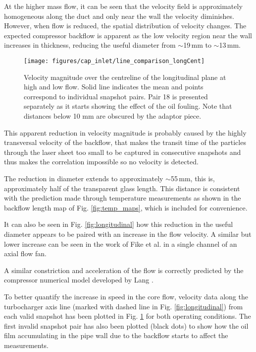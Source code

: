 At the higher mass flow, it can be seen that the velocity field is approximately homogeneous along the duct and only near the wall the velocity diminishes. However, when flow is reduced, the spatial distribution of velocity changes. The expected compressor backflow is apparent as the low velocity region near the wall increases in thickness, reducing the useful diameter from $\sim$19\,mm to $\sim$13\,mm.

\begin{figure}[t!]
\centering
\texttt{[image: figures/cap\_inlet/line\_comparison\_longCent]}
\caption{Velocity magnitude over the centreline of the longitudinal plane at high and low flow. Solid line indicates the mean and points correspond to individual snapshot pairs. Pair 18 is presented separately as it starts showing the effect of the oil fouling. Note that distances below 10 mm are obscured by the adaptor piece.}
\label{fig:line_comp_long}
\end{figure}

This apparent reduction in velocity magnitude is probably caused by  the highly transversal velocity of the backflow, that makes the transit time of the particles through the laser sheet too small to be captured in consecutive snapshots and thus makes the correlation impossible so no velocity is detected.

The reduction in diameter extends to approximately $\sim$55\,mm, this is, approximately half of the transparent glass length. This distance is consistent with the prediction made through temperature measurements as shown in the backflow length map of Fig. \ref{fig:temp_maps}, which is included for convenience.

It can also be seen in Fig. \ref{fig:longitudinal} how this reduction in the useful diameter appears to be paired with an increase in the flow velocity. A similar but lower increase can be seen in the work of Fike et al. \cite{fike2014visualisation} in a single channel of an axial flow fan.

A similar constriction and acceleration of the flow is correctly predicted by the compressor numerical model developed by Lang \cite{lang2011contribucion}.

To better quantify the increase in speed in the core flow, velocity data along the turbocharger axis line (marked with dashed line in Fig. \ref{fig:longitudinal}) from each valid snapshot has been plotted in Fig. \ref{fig:line_comp_long} for both operating conditions. The first invalid snapshot pair has also been plotted (black dots) to show how the oil film accumulating in the pipe wall due to the backflow starts to affect the measurements.

